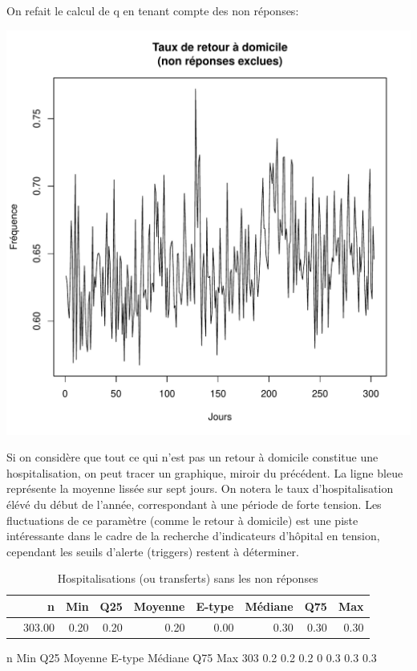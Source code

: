\documentclass[12pt,english,french,twoside]{report}\usepackage[]{graphicx}\usepackage[]{color}
\makeatletter
\def\maxwidth{ %
  \ifdim\Gin@nat@width>\linewidth
    \linewidth
  \else
    \Gin@nat@width
  \fi
}
\makeatother
\begin{document}
On refait le calcul de q en tenant compte des non réponses:

\includegraphics[width=\maxwidth]{figure/retour_dom2} 



Si on considère que tout ce qui n'est pas un retour à domicile constitue une hospitalisation, on peut tracer un graphique, miroir du précédent. La ligne bleue représente la moyenne lissée sur sept jours. On notera le taux d'hospitalisation élévé du début de l'année, correspondant à une période de forte tension. Les fluctuations de ce paramètre (comme le retour à domicile) est une piste intéressante dans le cadre de la recherche d'indicateurs d'hôpital en tension, cependant les seuils d'alerte (triggers) restent à déterminer.

\begin{table}[ht]
\centering
\begin{tabular}{rrrrrrrrr}
  \hline
 & n & Min & Q25 & Moyenne & E-type & Médiane & Q75 & Max \\ 
  \hline
 & 303.00 & 0.20 & 0.20 & 0.20 & 0.00 & 0.30 & 0.30 & 0.30 \\ 
   \hline
\end{tabular}
\caption[Hospitalisations]{Hospitalisations (ou transferts) sans les non réponses} 
\label{tab:hosp}
\end{table}
   n Min Q25 Moyenne E-type Médiane Q75 Max
 303 0.2 0.2     0.2      0     0.3 0.3 0.3
\end{document}
